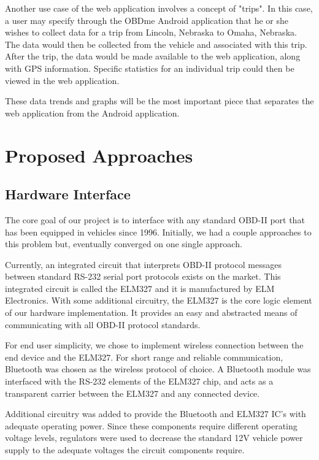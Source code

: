 \documentclass[12pt]{article}
\begin{document}
Another use case of the web application involves a concept of "trips".  In this case, a user may specify through the OBDme Android application that he or she wishes to collect data for a trip from Lincoln, Nebraska to Omaha, Nebraska.  The data would then be collected from the vehicle and associated with this trip.  After the trip, the data would be made available to the web application, along with GPS information.  Specific statistics for an individual trip could then be viewed in the web application.  

These data trends and graphs will be the most important piece that separates the web application from the Android application.

\section{Proposed Approaches}\label{sec:ProposedApproaches}

\subsection{Hardware Interface}\label{subsec:HardwareInterface}
The core goal of our project is to interface with any standard OBD-II port that has been equipped in vehicles since 1996.  Initially, we had a couple approaches to this problem but, eventually converged on one single approach.

Currently, an integrated circuit that interprets OBD-II protocol messages between standard RS-232 serial port protocols exists on the market.  This integrated circuit is called the ELM327 and it is manufactured by ELM Electronics.  With some additional circuitry, the ELM327 is the core logic element of our hardware implementation.  It provides an easy and abstracted means of communicating with all OBD-II protocol standards.

For end user simplicity, we chose to implement wireless connection between the end device and the ELM327.  For short range and reliable communication, Bluetooth was chosen as the wireless protocol of choice.  A Bluetooth module was interfaced with the RS-232 elements of the ELM327 chip, and acts as a transparent carrier between the ELM327 and any connected device.

Additional circuitry was added to provide the Bluetooth and ELM327 IC's with adequate operating power.  Since these components require different operating voltage levels, regulators were used to decrease the standard 12V vehicle power supply to the adequate voltages the circuit components require.
\end{document}
